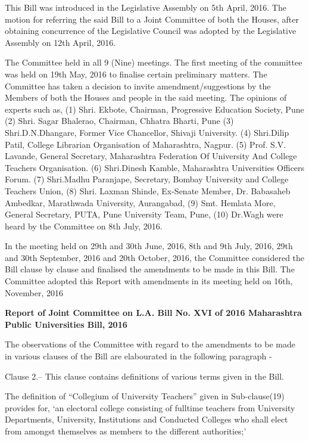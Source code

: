 \documentclass[default]{mhact}
\begin{document}
{      This Bill was introduced in the Legislative Assembly on 5th
      April, 2016. The motion for referring the said Bill to a Joint
      Committee of both the Houses, after obtaining concurrence of the
      Legislative Council was adopted by the Legislative Assembly on
      12th April, 2016.

      The Committee held in all 9 (Nine) meetings. The first meeting
      of the committee was held on 19th May, 2016 to finalise certain
      preliminary matters. The Committee has taken a decision to
      invite amendment/suggestions by the Members of both the Houses
      and people in the said meeting. The opinions of experts such as,
      (1) Shri. Ekbote, Chairman, Progressive Education Society, Pune
      (2) Shri. Sagar Bhalerao, Chairman, Chhatra Bharti, Pune (3)
      Shri.D.N.Dhangare, Former Vice Chancellor, Shivaji University.
      (4) Shri.Dilip Patil, College Librarian Organisation of
      Maharashtra, Nagpur. (5) Prof. S.V. Lavande, General
      Secretary, Maharashtra Federation Of University And College
      Teachers Organisation. (6) Shri.Dinesh Kamble, Maharashtra
      Universities Officers Forum. (7) Shri.Madhu Paranjape,
      Secretary, Bombay University and College Teachers Union, (8)
      Shri. Laxman Shinde, Ex-Senate Member, Dr. Babasaheb Ambedkar,
      Marathwada University, Aurangabad, (9) Smt. Hemlata More,
      General Secretary, PUTA, Pune University Team, Pune, (10)
      Dr.Wagh were heard by the Committee on 8th July, 2016.

      In the meeting held on 29th and 30th June, 2016, 8th and 9th
      July, 2016, 29th and 30th September, 2016 and 20th October,
      2016, the Committee considered the Bill clause by clause and
      finalised the amendments to be made in this Bill. The Committee
      adopted this Report with amendments in its meeting held on 16th,
      November, 2016

      \begin{center}
        \textbf{Report of Joint Committee on L.A. Bill No. XVI of 2016
          Maharashtra Public Universities Bill, 2016}
      \end{center}
      The observations of the Committee with regard to the amendments
      to be made in various clauses of the Bill are elabourated in the
      following paragraph -

      Clause 2.– This clause contains definitions of various terms
      given in the Bill.

      The definition of ``Collegium of University Teachers'' given in
      Sub-clause(19) provides for, `an electoral college consisting
      of fulltime teachers from University Departments, University,
      Institutions and Conducted Colleges who shall elect from amongst
      themselves as members to the different authorities;'

}
\end{document}
